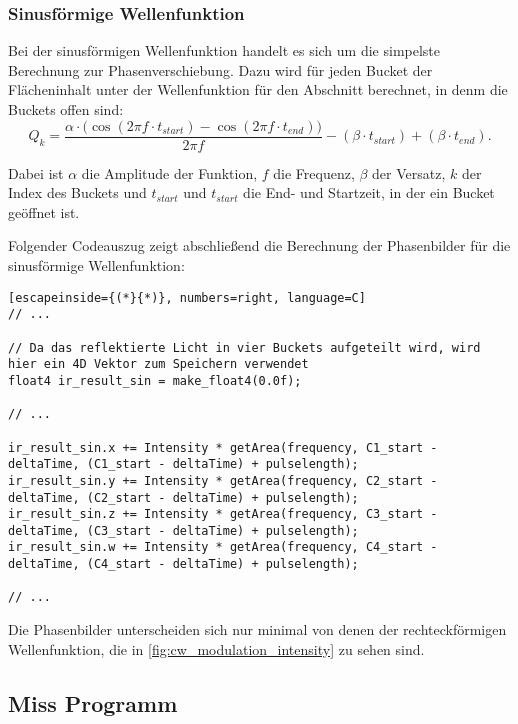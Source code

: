 \documentclass[thesis.tex]{subfiles}
\begin{document}
\subsubsection{Sinusförmige Wellenfunktion}
%
Bei der sinusförmigen Wellenfunktion handelt es sich um die simpelste Berechnung zur Phasenverschiebung. Dazu wird für jeden Bucket der Flächeninhalt unter der Wellenfunktion für den Abschnitt berechnet, in denm die Buckets offen sind:
\begin{equation}Q_{k}=\frac{\alpha \cdot \Big(\cos(2 \pi f \cdot t_{start}) - \cos(2 \pi f \cdot t_{end}) \Big)}{2 \pi f} - (\beta \cdot t_{start}) + (\beta \cdot t_{end}).\end{equation}

Dabei ist $\alpha$ die Amplitude der Funktion, $f$ die Frequenz, $\beta$ der Versatz, $k$ der Index des Buckets und $t_{start}$ und $t_{start}$ die End- und Startzeit, in der ein Bucket geöffnet ist.

Folgender Codeauszug zeigt abschließend die Berechnung der Phasenbilder für die sinusförmige Wellenfunktion:
%
\begin{lstlisting}[escapeinside={(*}{*)}, numbers=right, language=C]
// ...

// Da das reflektierte Licht in vier Buckets aufgeteilt wird, wird hier ein 4D Vektor zum Speichern verwendet
float4 ir_result_sin = make_float4(0.0f);

// ...

ir_result_sin.x += Intensity * getArea(frequency, C1_start - deltaTime, (C1_start - deltaTime) + pulselength);
ir_result_sin.y += Intensity * getArea(frequency, C2_start - deltaTime, (C2_start - deltaTime) + pulselength);
ir_result_sin.z += Intensity * getArea(frequency, C3_start - deltaTime, (C3_start - deltaTime) + pulselength);
ir_result_sin.w += Intensity * getArea(frequency, C4_start - deltaTime, (C4_start - deltaTime) + pulselength);

// ...

\end{lstlisting}
%
Die Phasenbilder unterscheiden sich nur minimal von denen der rechteckförmigen Wellenfunktion, die in \autoref{fig:cw_modulation_intensity} zu sehen sind.
%
\subsection{Miss Programm}
\end{document}

